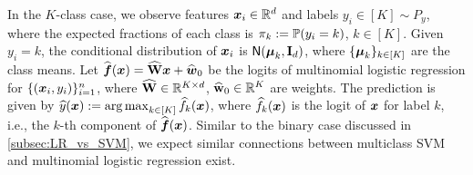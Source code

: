 In the $K$-class case, we observe features $\xx_i \in \R^d$ and labels $y_i \in [K] \sim P_y$, where the expected fractions of each class is $\pi_k := \P(y_i = k)$, $k \in [K]$. Given $y_i = k$, the conditional distribution of $\xx_i$ is $\normal (\vmu_k, \bI_d)$, where $\{ \vmu_k \}_{k \in [K]}$ are the class means. Let $\hat\vf(\xx) = \hat\bW \xx + \hat \vw_0$ be the logits of multinomial logistic regression for $\{ (\xx_i, y_i) \}_{i=1}^{n}$, where $\hat\bW \in \R^{K \times d}$, $\hat \bw_0 \in \R^K$ are weights. The prediction is given by $\hat y(\xx) := \argmax_{k \in [K]} \hat f_k(\xx)$, where $\hat f_k(\xx)$ is the logit of $\xx$ for label $k$, i.e., the $k$-th component of $\hat\vf(\xx)$. Similar to the binary case discussed in \cref{subsec:LR_vs_SVM}, we expect similar connections between multiclass SVM and multinomial logistic regression exist. 

